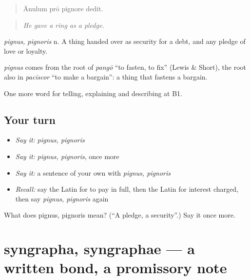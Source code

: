 \begin{quote}
Ānulum prō pignore dedit.
\end{quote}

\begin{quote}
\emph{He gave a ring as a pledge.}
\end{quote}

\emph{pignus, pignoris} n. A thing handed over as security for a debt, and any pledge of love or loyalty.

\begin{cousinweb}
\emph{pignus} comes from the root of \emph{pangō} \textquotedblleft{}to fasten, to fix\textquotedblright{} (Lewis \& Short), the root also in \emph{pacīscor} \textquotedblleft{}to make a bargain\textquotedblright{}: a thing that fastens a bargain.
\end{cousinweb}

\begin{grammarlens}[title={What you've built}]
One more word for telling, explaining and describing at B1.
\end{grammarlens}

\subsection*{Your turn}
\begin{itemize}
\raggedright
  \item \emph{Say it:} \emph{pignus, pignoris}
  \item \emph{Say it:} \emph{pignus, pignoris}, once more
  \item \emph{Say it:} a sentence of your own with \emph{pignus, pignoris}
  \item \emph{Recall:} say the Latin for to pay in full, then the Latin for interest charged, then say \emph{pignus, pignoris} again
\end{itemize}

\begin{tcolorbox}[breakable,colback=teal!4,colframe=teal!35!black,title={Before you move on}]
What does pignus, pignoris mean? (\textquotedblleft{}A pledge, a security\textquotedblright{}.) Say it once more.
\end{tcolorbox}
\section[syngrapha, syngraphae]{syngrapha, syngraphae — a written bond, a promissory note}

\label{lesson:LA-C419-syngrapha}



